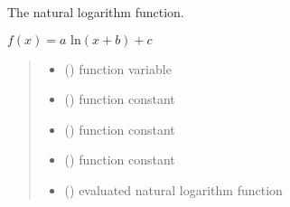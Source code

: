\documentclass[letterpaper,10pt,english]{sphinxmanual}
\begin{document}

\begin{fulllineitems}
\label{\detokenize{01_utils:skinoptics.utils.natural_log}}
\pysigstartsignatures
{}
\pysigstopsignatures
\sphinxAtStartPar
The natural logarithm function.

\sphinxAtStartPar
\(f(x) = a \mbox{ ln}(x + b) + c\)
\begin{quote}\begin{description}
\begin{itemize}
\item {} 
\sphinxAtStartPar
{} () \textendash{} function variable

\item {} 
\sphinxAtStartPar
{} () \textendash{} function constant

\item {} 
\sphinxAtStartPar
{} () \textendash{} function constant

\item {} 
\sphinxAtStartPar
{} () \textendash{} function constant

\end{itemize}

\sphinxAtStartPar
\begin{itemize}
\item {} 
\sphinxAtStartPar
{} () \textendash{} evaluated natural logarithm function

\end{itemize}


\end{description}\end{quote}

\end{fulllineitems}
\end{document}
